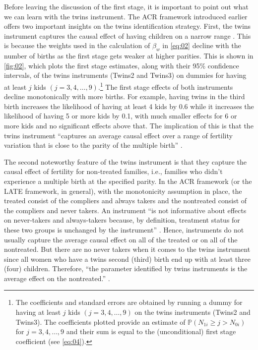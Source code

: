 Before leaving the discussion of the first stage, it is important to point out what we can learn with the twins instrument. The ACR framework introduced earlier offers two important insights on the twins identification strategy. First, the twins instrument captures the causal effect of having children on a narrow range \parencite{angrist_multiple_2010}. This is because the weights used in the calculation of $ \beta_{w} $ in \eqref{eq:02} decline with the number of births as the first stage gets weaker at higher parities. This is shown in \autoref{fig:02}, which plots the first stage estimates, along with their 95\% confidence intervals, of the twins instruments (Twins2 and Twins3) on dummies for having at least $ j $ kids $ (j = 3, 4, \dots, 9) $.\footnote{ The coefficients and standard errors are obtained by running a dummy for having at least $ j $ kids $ (j = 3, 4, \dots, 9) $ on the twins instruments (Twins2 and Twins3). The coefficients plotted provide an estimate of $ \mathbb{P}(N_{1i} \geq j > N_{0i}) $ for $ j = 3, 4, \dots, 9 $ and their sum is equal to the (unconditional) first stage coefficient (see \eqref{eq:04}). } The first stage effects of both instruments decline monotonically with more births. For example, having twins in the third birth increases the likelihood of having at least 4 kids by 0.6 while it increases the likelihood of having 5 or more kids by 0.1, with much smaller effects for 6 or more kids and no significant effects above that.  The implication of this is that the twins instrument \enquote{captures an average causal effect over a range of fertility variation that is close to the parity of the multiple birth} \parencite[p.~788]{angrist_multiple_2010}. 

The second noteworthy feature of the twins instrument is that they capture the causal effect of fertility for non-treated families, i.e., families who didn't experience a multiple birth at the specified parity. In the ACR framework (or the LATE framework, in general), with the monotonicity assumption in place, the treated consist of the compliers and always takers and the nontreated consist of the compliers and never takers. An instrument \enquote{is not informative about effects on never-takers and always-takers because, by definition, treatment status for these two groups is unchanged by the instrument} \parencite[p.~158]{Angrist2009}. Hence, instruments do not usually capture the average causal effect on all of the treated or on all of the nontreated. But there are no never takers when it comes to the twins instrument since all women who have a twins second (third) birth end up with at least three (four) children. Therefore, \enquote{the parameter identified by twins instruments is the average effect on the nontreated.} \parencite[p.~788]{angrist_multiple_2010}.













